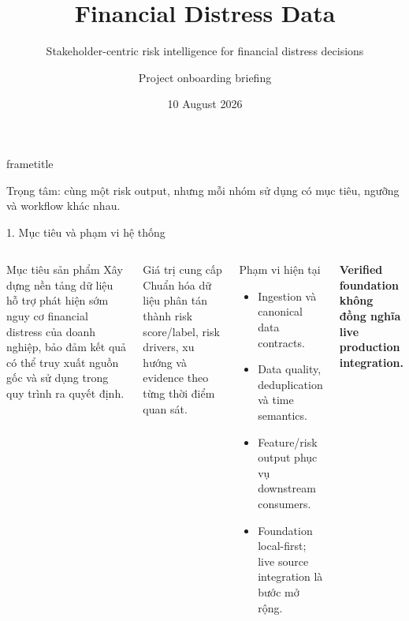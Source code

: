 \documentclass[aspectratio=169,11pt]{beamer}
\title{Financial Distress Data}
\subtitle{Stakeholder-centric risk intelligence for financial distress decisions}
\author{Project onboarding briefing}
\institute{Financial Distress Data Engineering System}
\date{10 August 2026}
\newcommand{\warn}[1]{\textcolor{fdorange}{\textbf{#1}}}
\begin{document}
\begin{frame}[plain]
  \vfill
  \begin{beamercolorbox}[sep=1em,wd=\textwidth]{frametitle}
    {\inserttitle\par}
    \vspace{.35em}
    {\insertsubtitle\par}
  \end{beamercolorbox}
  \vspace{1em}
  \vfill
  \centering\small\textcolor{fdink!70}{Trọng tâm: cùng một risk output, nhưng mỗi nhóm sử dụng có mục tiêu, ngưỡng và workflow khác nhau.}
\end{frame}

\begin{frame}{1. Mục tiêu và phạm vi hệ thống}
  \small
  \begin{columns}[T,totalwidth=\textwidth]
      \begin{block}{Mục tiêu sản phẩm}
        Xây dựng nền tảng dữ liệu hỗ trợ phát hiện sớm nguy cơ financial distress của doanh nghiệp, bảo đảm kết quả có thể truy xuất nguồn gốc và sử dụng trong quy trình ra quyết định.
      \end{block}
      \begin{exampleblock}{Giá trị cung cấp}
        Chuẩn hóa dữ liệu phân tán thành risk score/label, risk drivers, xu hướng và evidence theo từng thời điểm quan sát.
      \end{exampleblock}
      \begin{block}{Phạm vi hiện tại}
        \begin{itemize}
          \item Ingestion và canonical data contracts.
          \item Data quality, deduplication và time semantics.
          \item Feature/risk output phục vụ downstream consumers.
          \item Foundation local-first; live source integration là bước mở rộng.
        \end{itemize}
      \end{block}
      \centering\scriptsize\warn{Verified foundation không đồng nghĩa live production integration.}
  \end{columns}
\end{frame}
\end{document}

